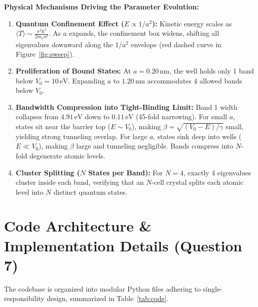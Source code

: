 \documentclass[10pt, a4paper]{article}
\begin{document}
\textbf{Physical Mechanisms Driving the Parameter Evolution:}
\begin{enumerate}\setlength{\itemsep}{1pt}\setlength{\parskip}{1pt}
    \item \textbf{Quantum Confinement Effect ($E \propto 1/a^2$):}
    Kinetic energy scales as $\langle T \rangle \sim \frac{\pi^2\hbar^2}{2m_e a^2}$. As $a$ expands, the confinement box widens, shifting all eigenvalues downward along the $1/a^2$ envelope (red dashed curve in Figure~\ref{fig:sweep}).
    \item \textbf{Proliferation of Bound States:}
    At $a = 0.20\,\text{nm}$, the well holds only 1 band below $V_0 = 10\,\text{eV}$. Expanding $a$ to $1.20\,\text{nm}$ accommodates 4 allowed bands below $V_0$.
    \item \textbf{Bandwidth Compression into Tight-Binding Limit:}
    Band 1 width collapses from $4.91\,\text{eV}$ down to $0.11\,\text{eV}$ (45-fold narrowing). For small $a$, states sit near the barrier top ($E \sim V_0$), making $\beta = \sqrt{(V_0-E)/\gamma}$ small, yielding strong tunneling overlap. For large $a$, states sink deep into wells ($E \ll V_0$), making $\beta$ large and tunneling negligible. Bands compress into $N$-fold degenerate atomic levels.
    \item \textbf{Cluster Splitting ($N$ States per Band):}
    For $N = 4$, exactly 4 eigenvalues cluster inside each band, verifying that an $N$-cell crystal splits each atomic level into $N$ distinct quantum states.
\end{enumerate}

\section{Code Architecture \& Implementation Details (Question 7)}

The codebase is organized into modular Python files adhering to single-responsibility design, summarized in Table~\ref{tab:code}.
\end{document}
